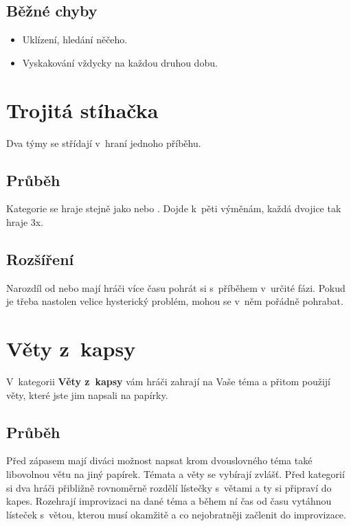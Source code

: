  
\subsection{ Běžné chyby } \begin{itemize}
\item Uklízení, hledání něčeho.
\item Vyskakování vždycky na každou druhou dobu.
\end{itemize}
 
 
 
\needspace{5cm} \section{Trojitá stíhačka} \label{trojitá stíhačka}  
Dva týmy se střídají v~hraní jednoho příběhu. 
 
\subsection{ Průběh } Kategorie se hraje stejně jako  nebo . Dojde k~pěti výměnám, každá dvojice tak hraje 3x. 
 
\subsection{ Rozšíření } Narozdíl od  nebo  mají hráči více času pohrát si s~příběhem v~určité fázi. Pokud je třeba nastolen velice hysterický problém, mohou se v~něm pořádně pohrabat. 
 
 
 
 
\needspace{5cm} \section{Věty z~kapsy} \label{věty z~kapsy}  
 
 
V~kategorii \textbf{Věty z~kapsy} vám hráči zahrají na Vaše téma a přitom použijí věty, které jste jim napsali na papírky. 
 
 
\subsection{Průběh} Před zápasem mají diváci možnost napsat krom dvouslovného téma také libovolnou větu na jiný papírek. Témata a věty se vybírají zvlášť. Před kategorií si dva hráči přibližně rovnoměrně rozdělí lístečky s~větami a ty si připraví do kapes. Rozehrají improvizaci na dané téma a během ní čas od času vytáhnou lísteček s~větou, kterou musí okamžitě a co nejobratněji začlenit do improvizace.  
 

